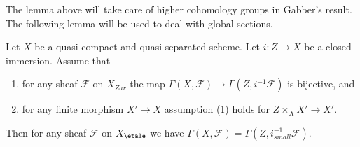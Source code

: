 \noindent
The lemma above will take care of higher cohomology groups in
Gabber's result. The following lemma will be used to deal with
global sections.

\begin{lemma}
\label{lemma-gabber-h0}
Let $X$ be a quasi-compact and quasi-separated scheme.
Let $i : Z \to X$ be a closed immersion. Assume that
\begin{enumerate}
\item for any sheaf $\mathcal{F}$ on $X_{Zar}$ the map
$\Gamma(X, \mathcal{F}) \to \Gamma(Z, i^{-1}\mathcal{F})$
is bijective, and
\item for any finite morphism $X' \to X$ assumption (1) holds
for $Z \times_X X' \to X'$.
\end{enumerate}
Then for any sheaf $\mathcal{F}$ on $X_\etale$ we have
$\Gamma(X, \mathcal{F}) = \Gamma(Z, i^{-1}_{small}\mathcal{F})$.
\end{lemma}

